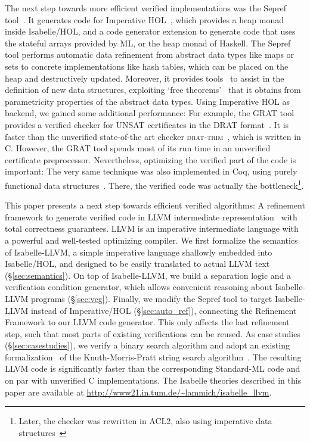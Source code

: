 \documentclass[a4paper,USenglish,cleveref, autoref]{lipics-v2019}
\begin{document}
The next step towards more efficient verified implementations was the Sepref tool~\cite{La15}. 
It generates code for Imperative HOL~\cite{BKHEM08}, which provides a heap monad inside Isabelle/HOL, 
and a code generator extension to generate code that uses the stateful arrays provided by ML, or the heap monad of Haskell.
The Sepref tool performs automatic data refinement from abstract data types like maps or sets to concrete implementations like hash tables, which 
can be placed on the heap and destructively updated. 
Moreover, it provides tools~\cite{La16} to assist in the definition of new data structures, exploiting `free theorems'~\cite{Wad89} that it 
obtains from parametricity properties of the abstract data types.
%
Using Imperative HOL as backend, we gained some additional performance: For example, the GRAT tool~\cite{La17_CADE,La17_SAT} provides a 
verified checker for UNSAT certificates in the DRAT format~\cite{WHH14}. It is faster than the unverified state-of-the art 
checker \textsc{drat-trim}~\cite{WHH14}, which is written in C. However, the GRAT tool spends most of its run time in an unverified 
certificate preprocessor. Nevertheless, optimizing the verified part of the code is important: The very same technique was also implemented in Coq,
using purely functional data structures~\cite{CMS17,CHHKS17}. There, the verified code was actually the 
bottleneck\footnote{Later, the checker was rewritten in ACL2, also using imperative data structures~\cite{CHHKS17,HHKW17}}.

This paper presents a next step towards efficient verified algorithms: A refinement framework to generate verified code in LLVM intermediate representation~\cite{LLVM-manual} 
with total correctness guarantees. LLVM is an imperative intermediate language with a powerful and well-tested optimizing compiler.
We first formalize the semantics of Isabelle-LLVM, a simple imperative language shallowly embedded into Isabelle/HOL, 
and designed to be easily translated to actual LLVM text (\S\ref{sec:semantics}). 
On top of Isabelle-LLVM, we build a separation logic and a verification condition generator, which allows convenient reasoning about Isabelle-LLVM programs (\S\ref{sec:vcg}).
Finally, we modify the Sepref tool to target Isabelle-LLVM instead of Imperative/HOL (\S\ref{sec:auto_ref}), connecting 
the Refinement Framework to our LLVM code generator. This only affects the last refinement step, 
such that most parts of existing verifications can be reused. 
As case studies (\S\ref{sec:casestudies}), we verify a binary search algorithm and adopt an existing formalization~\cite{HeLa17} of
the Knuth-Morris-Pratt string search algorithm~\cite{KMP77}. The resulting LLVM code is significantly
faster than the corresponding Standard-ML code and on par with unverified C implementations.
%
The Isabelle theories described in this paper are available at \url{http://www21.in.tum.de/~lammich/isabelle_llvm}. 
\end{document}

